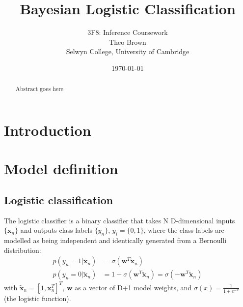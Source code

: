 \documentclass[a4paper]{article}
\begin{document}
    \title{Bayesian Logistic Classification}
    \author{3F8: Inference Coursework \\ Theo Brown \\ Selwyn College, University of Cambridge}
    \date{\today}
    \maketitle

    \begin{abstract}
        Abstract goes here
    \end{abstract}
    
    \section{Introduction}\label{sec:introduction}

    \section{Model definition}\label{sec:model-definition}
    \subsection{Logistic classification}
    The logistic classifier is a binary classifier that takes N D-dimensional inputs $\{\bm{x}_n\}$ and outputs class labels $\{y_n\}$, $y_i = \{0, 1\}$, where the class labels are modelled as being independent and identically generated from a Bernoulli distribution:
    \begin{align}
        p(y_n = 1 | \tilde{\bm{x}}_n) &= \sigma (\bm{w}^T\tilde{\bm{x}}_n) \nonumber \\
        p(y_n = 0 | \tilde{\bm{x}}_n) &= 1 - \sigma (\bm{w}^T\tilde{\bm{x}}_n) = \sigma (-\bm{w}^T\tilde{\bm{x}}_n)
        \label{eq:logistic-classifier}
    \end{align}
    with $\tilde{\bm{x}}_n = \left[1, \bm{x}_n^T \right]^T$, $\bm{w}$ as a vector of D+1 model weights, and $\sigma(x) = \frac{1}{1 + e^{-x}}$ (the logistic function).
\end{document}

